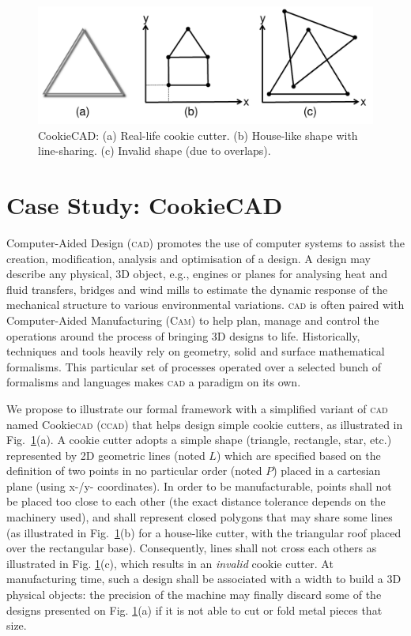 \begin{figure}[t]
   \centering
   \includegraphics[width=\columnwidth]{CookieCAD.pdf}%
   \vspace{-1em}
   \caption{CookieCAD: (a) Real-life cookie cutter. (b) House-like 
shape with line-sharing. (c) Invalid shape (due to overlaps).}%
   \label{fig:CookieCAD}
\end{figure}

\section{Case Study: CookieCAD}
\label{sec:CS}

\enlargethispage{6pt}


Computer-Aided Design (\textsc{cad}) \cite{B:Groover-Zimmers:2008} promotes the
use of computer systems to assist the creation, modification, analysis and
optimisation of a design.
A design may describe any physical, 3D object, e.g., engines or planes for
analysing heat and fluid transfers, bridges and wind mills to estimate the
dynamic response of the mechanical structure to various environmental
variations. \textsc{cad} is often paired with Computer-Aided Manufacturing
(\textsc{Cam}) to help plan, manage and control the operations around the
process of bringing 3D designs to life. Historically, techniques and tools
heavily rely on geometry, solid and surface mathematical formalisms. This
particular set of processes operated over a selected bunch of formalisms and
languages makes \textsc{cad} a paradigm on its own.

We propose to illustrate our formal framework with a simplified variant of 
\textsc{cad} named Cookie\textsc{cad} (\textsc{ccad}) that helps design simple 
cookie cutters, as illustrated in Fig.~\ref{fig:CookieCAD}(a). A cookie cutter 
adopts a simple shape (triangle, rectangle, star, etc.) represented by 2D geometric 
lines (noted $L$) which are specified based on the definition of two points in 
no particular order (noted $P$) placed in a cartesian plane (using x-/y- 
coordinates). In order to be manufacturable, points shall not be placed too 
close to each other (the exact distance tolerance depends on the machinery 
used), and shall represent closed polygons that may share some lines (as 
illustrated in Fig.~\ref{fig:CookieCAD}(b) for a house-like cutter, with the 
triangular roof placed over the rectangular base). Consequently, lines shall not 
cross each others as illustrated in Fig. \ref{fig:CookieCAD}(c), which results 
in an \emph{invalid} cookie cutter. At manufacturing time, such a design shall 
be associated with a width to build a 3D physical objects: the precision of the 
machine may finally discard some of the designs presented on Fig. 
\ref{fig:CookieCAD}(a) if it is not able to cut or fold metal pieces that size.

